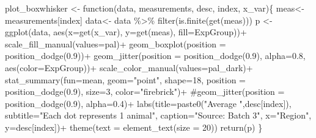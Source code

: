 \documentclass[
  12pt,
  letterpaper,
  DIV=11,
  numbers=noendperiod]{scrartcl}
\newenvironment{Shaded}{\begin{snugshade}}{\end{snugshade}}
\newcommand{\AttributeTok}[1]{\textcolor[rgb]{0.40,0.45,0.13}{#1}}
\newcommand{\CommentTok}[1]{\textcolor[rgb]{0.37,0.37,0.37}{#1}}
\newcommand{\ControlFlowTok}[1]{\textcolor[rgb]{0.00,0.23,0.31}{#1}}
\newcommand{\DecValTok}[1]{\textcolor[rgb]{0.68,0.00,0.00}{#1}}
\newcommand{\FloatTok}[1]{\textcolor[rgb]{0.68,0.00,0.00}{#1}}
\newcommand{\FunctionTok}[1]{\textcolor[rgb]{0.28,0.35,0.67}{#1}}
\newcommand{\NormalTok}[1]{\textcolor[rgb]{0.00,0.23,0.31}{#1}}
\newcommand{\OtherTok}[1]{\textcolor[rgb]{0.00,0.23,0.31}{#1}}
\newcommand{\SpecialCharTok}[1]{\textcolor[rgb]{0.37,0.37,0.37}{#1}}
\newcommand{\StringTok}[1]{\textcolor[rgb]{0.13,0.47,0.30}{#1}}
\begin{document}
\begin{Shaded}
\begin{Highlighting}[]
\NormalTok{plot\_boxwhisker }\OtherTok{\textless{}{-}} \ControlFlowTok{function}\NormalTok{(data, measurements, desc, index, x\_var)\{}
\NormalTok{  meas}\OtherTok{\textless{}{-}}\NormalTok{ measurements[index]}
\NormalTok{  data}\OtherTok{\textless{}{-}}\NormalTok{ data }\SpecialCharTok{\%\textgreater{}\%} \FunctionTok{filter}\NormalTok{(}\FunctionTok{is.finite}\NormalTok{(}\FunctionTok{get}\NormalTok{(meas)))}
\NormalTok{  p }\OtherTok{\textless{}{-}} \FunctionTok{ggplot}\NormalTok{(data, }\FunctionTok{aes}\NormalTok{(}\AttributeTok{x=}\FunctionTok{get}\NormalTok{(x\_var), }\AttributeTok{y=}\FunctionTok{get}\NormalTok{(meas), }\AttributeTok{fill=}\NormalTok{ExpGroup))}\SpecialCharTok{+}
  \FunctionTok{scale\_fill\_manual}\NormalTok{(}\AttributeTok{values=}\NormalTok{pal)}\SpecialCharTok{+}
  \FunctionTok{geom\_boxplot}\NormalTok{(}\AttributeTok{position =} \FunctionTok{position\_dodge}\NormalTok{(}\FloatTok{0.9}\NormalTok{))}\SpecialCharTok{+}
  \FunctionTok{geom\_jitter}\NormalTok{(}\AttributeTok{position =} \FunctionTok{position\_dodge}\NormalTok{(}\FloatTok{0.9}\NormalTok{), }\AttributeTok{alpha=}\FloatTok{0.8}\NormalTok{, }\FunctionTok{aes}\NormalTok{(}\AttributeTok{color=}\NormalTok{ExpGroup))}\SpecialCharTok{+}
  \FunctionTok{scale\_color\_manual}\NormalTok{(}\AttributeTok{values=}\NormalTok{pal\_dark)}\SpecialCharTok{+}
  \FunctionTok{stat\_summary}\NormalTok{(}\AttributeTok{fun=}\NormalTok{mean, }\AttributeTok{geom=}\StringTok{"point"}\NormalTok{, }\AttributeTok{shape=}\DecValTok{18}\NormalTok{,}
               \AttributeTok{position =} \FunctionTok{position\_dodge}\NormalTok{(}\FloatTok{0.9}\NormalTok{),}
               \AttributeTok{size=}\DecValTok{3}\NormalTok{, }\AttributeTok{color=}\StringTok{"firebrick"}\NormalTok{)}\SpecialCharTok{+}
  \CommentTok{\#geom\_jitter(position = position\_dodge(0.9), alpha=0.4)+}
  \FunctionTok{labs}\NormalTok{(}\AttributeTok{title=}\FunctionTok{paste0}\NormalTok{(}\StringTok{"Average "}\NormalTok{,desc[index]), }
       \AttributeTok{subtitle=}\StringTok{"Each dot represents 1 animal"}\NormalTok{,}
       \AttributeTok{caption=}\StringTok{"Source: Batch 3"}\NormalTok{,}
       \AttributeTok{x=}\StringTok{"Region"}\NormalTok{,}
       \AttributeTok{y=}\NormalTok{desc[index])}\SpecialCharTok{+}
  \FunctionTok{theme}\NormalTok{(}\AttributeTok{text =} \FunctionTok{element\_text}\NormalTok{(}\AttributeTok{size =} \DecValTok{20}\NormalTok{))}
  \FunctionTok{return}\NormalTok{(p)}
\NormalTok{\}}
\end{Highlighting}
\end{Shaded}
\end{document}
